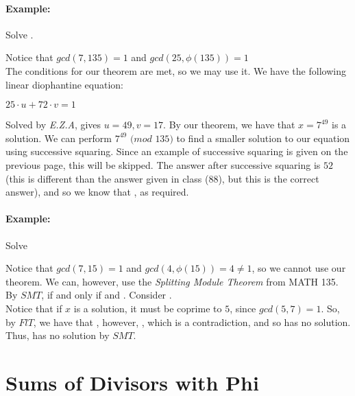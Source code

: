 \documentclass[../main.tex]{subfiles}
\begin{document}
\paragraph{Example:} Solve .
\begin{ans}
    Notice that $gcd(7,135)=1$ and $gcd(25, \phi(135))=1$ \\
    The conditions for our theorem are met, so we may use it. \sspace
    We have the following linear diophantine equation: \\
    \centerline{$25 \cdot u + 72 \cdot v = 1$}
    Solved by \textit{E.Z.A}, gives $u=49, v=17$. \sspace
    By our theorem, we have that $x=7^{49}$ is a solution. We can perform $7^{49}$ $(mod$ $135)$ to find a smaller solution to our equation using successive squaring. Since an example of successive squaring is given on the previous page, this will be skipped. The answer after successive squaring is $52$ (this is different than the answer given in class (88), but this is the correct answer), and so we know that , as required.
\end{ans}

\paragraph{Example:} Solve 
\begin{ans}
    Notice that $gcd(7,15)=1$ and $gcd(4, \phi(15))=4 \neq 1$, so we cannot use our theorem. \sspace
    We can, however, use the \textit{Splitting Module Theorem} from MATH 135. \\
    By $SMT$,  if and only if  and . \sspace
    Consider . \\
    Notice that if $x$ is a solution, it must be coprime to $5$, since $gcd(5,7)=1$. So, by $FlT$, we have that , however, , which is a contradiction, and so  has no solution. \\
    Thus,  has no solution by $SMT$.
\end{ans}

\section{Sums of Divisors with Phi}
\end{document}
